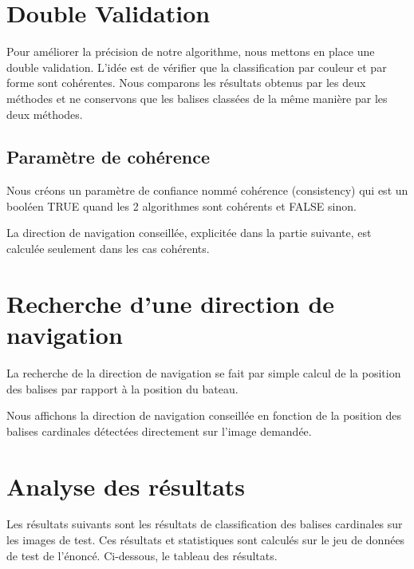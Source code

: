 \documentclass{article}
\begin{document}
\section{Double Validation}

Pour améliorer la précision de notre algorithme, nous mettons en place une
double validation. L'idée est de vérifier que la classification par couleur et
par forme sont cohérentes. Nous comparons les résultats obtenus par les deux
méthodes et ne conservons que les balises classées de la même manière par les
deux méthodes.

\subsection{Paramètre de cohérence}
Nous créons un paramètre de confiance nommé cohérence (consistency) qui est un
booléen TRUE quand les 2 algorithmes sont cohérents et FALSE sinon.

La direction de navigation conseillée, explicitée dans la partie suivante, est
calculée seulement dans les cas cohérents.

\section{Recherche d'une direction de navigation}

La recherche de la direction de navigation se fait par simple calcul de la
position des balises par rapport à la position du bateau.

Nous affichons la direction de navigation conseillée en fonction de la position
des balises cardinales détectées directement sur l'image demandée.

\section{Analyse des résultats}

Les résultats suivants sont les résultats de classification des balises
cardinales sur les images de test. Ces résultats et statistiques sont calculés
sur le jeu de données de test de l'énoncé. Ci-dessous, le tableau des
résultats.
\end{document}
